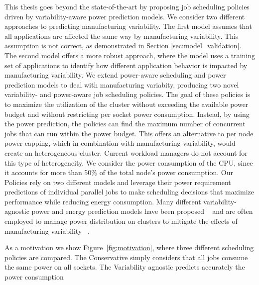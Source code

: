 \par
This thesis goes beyond the state-of-the-art by proposing job scheduling policies driven by
variability-aware power prediction models.  We consider two different approaches to
predicting manufacturing variability.  The first model assumes that all applications
are affected the same way by manufacturing variability.  This assumption is not correct, as 
demonstrated in Section \ref{sec:model_validation}. The second model offers a more robust
approach, where the model uses a training set of applications to identify how different application
behavior is impacted by manufacturing variability.
We extend power-aware scheduling and power
prediction models to deal with manufacturing variabity,  producing two novel variability-
and power-aware job scheduling policies.  The goal of these policies is to maximize the
utilization of the cluster without exceeding the available power budget and without
restricting per socket power consumption.  Instead, by using the power prediction, the
policies can find the maximum number of concurrent jobs that can run within the power
budget.  This offers an alternative to per node power capping, which in combination with
manufacturing variability, would create an heterogeneous cluster.  Current workload
managers do not account for this type of heterogeneity.   
We consider the power consumption of the CPU,
since it accounts for more than 50\% \cite{ShuaiwenSong:2009:EPA:1572226.1572228} of the
total node's power consumption.  Our Policies rely on two different models and leverage
their power requirement predictions of individual parallel jobs to make scheduling
decisions that maximize performance while reducing energy consumption.  Many different
variability-agnostic power and energy prediction models have been proposed
~\cite{Bircher:2012:CSP:2196827.2196987,Bertran:2012:SEC:2457472.2457499,Bertran:2010:DRP:1810085.1810108,Goel:2010:PSP:1909624.1909734,Isci:2003:RPM:956417.956567}
	and are often employed to manage power distribution on clusters to mitigate the effects of
manufacturing variability
~\cite{Chasapis:2016:RMM:2925426.2926279,Inadomi:2015:AMI:2807591.2807638,Gholkar:2016:PTH:2967938.2967961,Ellsworth:2015:DPS:2807591.2807643,Bailey:2015:FLP:2807591.2807637,Teodorescu:2008:VAS:1381306.1382152,Totoni:tech:2014}.
\par
As a motivation we show Figure~\ref{fig:motivation}, where three different scheduling
policies are compared.  The Conservative simply considers that all jobs consume the same
power on all sockets.  The Variability agnostic predicts accurately the power consumption
